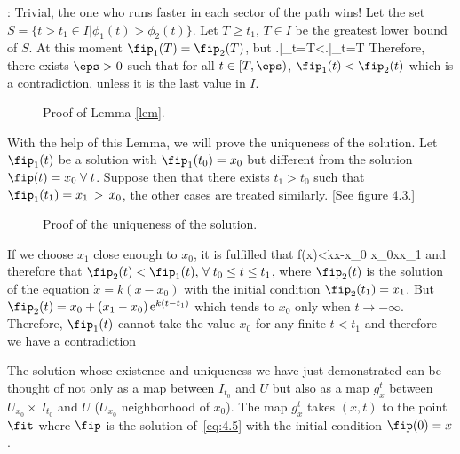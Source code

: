 \espa


\pru: Trivial, the one who runs faster in each sector of the path wins!
Let the set $S = \{t>t_1 \in I | \phi_1(t) > \phi_2(t)\}$. 
Let $T \geq t_1$, $T \in I$ be the greatest lower bound of $S$.
 At this moment
$\fip_1(T)=\fip_2(T)$, 
but 
\beq 
\left.\right|_{t=T}<\left.\right|_{t=T}
\eeq 
%
Therefore, there exists $\eps > 0$ such that for all $t \in [T,\eps)$, 
$\fip_1(t)<\fip_2(t)$ which is
a contradiction, unless it is the last value in $I$.

\begin{figure}[htbp]
  \begin{center}
    \caption{Proof of Lemma \ref{lem}.}
    \label{fig:4_2}
  \end{center}
\end{figure}

With the help of this Lemma, we will prove the uniqueness of the solution.
Let $\fip_1(t)$ be a solution with $\fip_1(t_0)=x_0$ but different from
the solution $\fip(t)=x_0\;\forall\;t$. 
Suppose then that there exists
$t_1>t_0$ such that $\fip_1(t_1)=x_1\,>\,x_0$, the other cases are
treated similarly. [See figure 4.3.] 
\begin{figure}[htbp]
  \begin{center}
    \caption{Proof of the uniqueness of the solution.}
    \label{fig:4_2_b}
  \end{center}
\end{figure}

If we choose $x_1$ close enough to $x_0$, it is fulfilled that
\beq 
f(x)<k\mid x-x_0\mid\;\;\forall \;\; x_0\leq x\leq x_1
\eeq 
and therefore that $\fip_2(t) < \fip_1(t),\,\forall\;t_0\leq
t\leq t_1$, where $\fip_2(t)$ is the solution of the equation $\dot
x= k(x-x_0)$ with the initial condition $\fip_2(t_1)=x_1$. 
But $\fip_2(t)=x_0+(x_1-x_0)\, \mbox{e}^{k(t-t_1)}$ which tends to $x_0$
only when $t\to -\infty$. Therefore, $\fip_1(t)$ cannot take the value
$x_0$ for any finite $t < t_1$ and therefore we have a
contradiction \epru

The solution whose existence and uniqueness we have just demonstrated can be thought of not only as a map between $I_{t_0}$ and $U$ but also
as a map $g_x^t$ between $U_{x_0}\times\,I_{t_0}$ and $U$ 
($U_{x_0}$ neighborhood of $x_0$). The map $g_x^t$ takes $(x,t)$ to the point
$\fit$ where $\fip$ is the solution of~\ref{eq:4.5} with the initial
condition $\fip (0)=x$.

